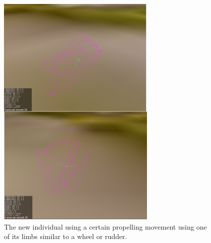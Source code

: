\documentclass[letterpaper, 10 pt, conference]{ieeeconf}  %
\begin{document}
\begin{figure}[tp]
    \centering
    \includegraphics[width=3in, clip] {figs/velocity-creature.png}
    \caption{The new individual using a certain propelling movement using one of its limbs similar to a wheel or rudder.}
    \label{velocity-creature}
\end{figure}
\end{document}
